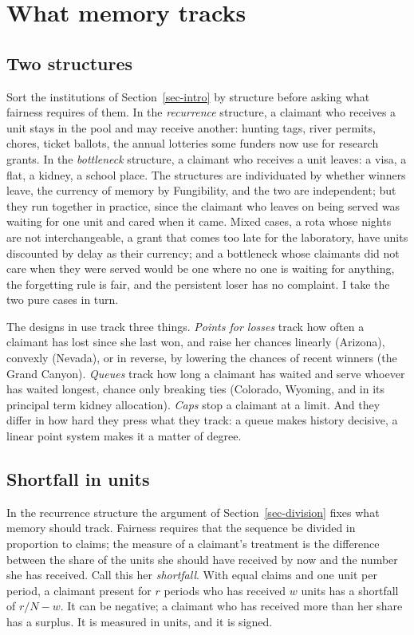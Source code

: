 \documentclass[
  11pt,
  letterpaper,
  DIV=11,
  numbers=noendperiod,
  twoside]{scrartcl}
\begin{document}
\section{What memory tracks}\label{sec-proportion}

\subsection{Two structures}\label{two-structures}

Sort the institutions of Section~\ref{sec-intro} by structure before
asking what fairness requires of them. In the \emph{recurrence}
structure, a claimant who receives a unit stays in the pool and may
receive another: hunting tags, river permits, chores, ticket ballots,
the annual lotteries some funders now use for research grants. In the
\emph{bottleneck} structure, a claimant who receives a unit leaves: a
visa, a flat, a kidney, a school place. The structures are individuated
by whether winners leave, the currency of memory by Fungibility, and the
two are independent; but they run together in practice, since the
claimant who leaves on being served was waiting for one unit and cared
when it came. Mixed cases, a rota whose nights are not interchangeable,
a grant that comes too late for the laboratory, have units discounted by
delay as their currency; and a bottleneck whose claimants did not care
when they were served would be one where no one is waiting for anything,
the forgetting rule is fair, and the persistent loser has no complaint.
I take the two pure cases in turn.

The designs in use track three things. \emph{Points for losses} track
how often a claimant has lost since she last won, and raise her chances
linearly (Arizona), convexly (Nevada), or in reverse, by lowering the
chances of recent winners (the Grand Canyon). \emph{Queues} track how
long a claimant has waited and serve whoever has waited longest, chance
only breaking ties (Colorado, Wyoming, and in its principal term kidney
allocation). \emph{Caps} stop a claimant at a limit. And they differ in
how hard they press what they track: a queue makes history decisive, a
linear point system makes it a matter of degree.

\subsection{Shortfall in units}\label{shortfall-in-units}

In the recurrence structure the argument of Section~\ref{sec-division}
fixes what memory should track. Fairness requires that the sequence be
divided in proportion to claims; the measure of a claimant's treatment
is the difference between the share of the units she should have
received by now and the number she has received. Call this her
\emph{shortfall}. With equal claims and one unit per period, a claimant
present for \(r\) periods who has received \(w\) units has a shortfall
of \(r/N - w\). It can be negative; a claimant who has received more
than her share has a surplus. It is measured in units, and it is signed.
\end{document}
